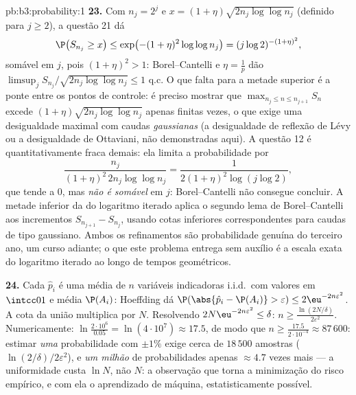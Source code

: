 \begin{solution}{pb:b3:probability:1}
\textbf{23.} Com $n_j = 2^j$ e $x = (1 +
\eta)\sqrt{2n_j\log\log n_j}$ (definido para $j \geq 2$),
a questão 21 dá
\[
\P\bigl(S_{n_j} \geq x\bigr) \leq \exp\bigl(-(1 +
\eta)^2\log\log n_j\bigr) = (j\log 2)^{-(1+\eta)^2},
\]
somável em $j$, pois $(1 + \eta)^2 > 1$: Borel--Cantelli
e $\eta = \frac1p$ dão $\limsup_jS_{n_j}/\sqrt{2n_j
\log\log n_j} \leq 1$ q.c. O que falta para a metade
superior  é a ponte entre os pontos de controle: é preciso
mostrar que $\max_{n_j\leq n\leq n_{j+1}}S_n$ excede
$(1+\eta)\sqrt{2n_j\log\log n_j}$ apenas finitas vezes,
o que exige uma desigualdade maximal com caudas \emph{gaussianas}
(a desigualdade de reflexão de Lévy ou a desigualdade de Ottaviani,
não demonstradas aqui). A questão 12 é quantitativamente
fraca demais: ela limita a probabilidade por
\[
\frac{n_j}{(1+\eta)^2\,2n_j\log\log n_j}
= \frac{1}{2(1+\eta)^2\log(j\log2)},
\]
que tende a $0$, mas \emph{não é somável} em $j$:
Borel--Cantelli não consegue concluir. A metade inferior da 
do logaritmo iterado aplica o segundo
lema de Borel--Cantelli aos incrementos 
$S_{n_{j+1}} - S_{n_j}$, usando cotas inferiores correspondentes para
caudas de tipo gaussiano. Ambos os refinamentos são probabilidade
genuína do terceiro ano, um curso adiante; o que este problema
entrega sem auxílio é a escala exata do logaritmo iterado
ao longo de tempos geométricos.

\textbf{24.} Cada $\hat p_i$ é uma média de $n$ variáveis
indicadoras i.i.d.\ com valores em $\intcc01$ e média
$\P(A_i)$: Hoeffding dá $\P(\abs{\hat p_i - \P(A_i)} >
\varepsilon) \leq 2\eu^{-2n\varepsilon^2}$. A cota da união
multiplica por $N$. Resolvendo $2N\eu^{-2n\varepsilon^2} \leq
\delta$: $n \geq \frac{\ln(2N/\delta)}{2\varepsilon^2}$.
Numericamente: $\ln\frac{2\cdot10^6}{0.05} =
\ln(4\cdot10^7) \approx 17.5$, de modo que $n \geq
\frac{17.5}{2\cdot10^{-4}} \approx 87\,600$: estimar
\emph{uma} probabilidade com $\pm1\%$ exige cerca de $18\,500$
amostras ($\ln(2/\delta)/2\varepsilon^2$), e
\emph{um milhão} de probabilidades apenas $\approx 4.7$ vezes mais
--- a uniformidade custa $\ln N$, não $N$: a observação que
torna a minimização do risco empírico, e com ela o aprendizado
de máquina, estatisticamente possível.


\end{solution}
